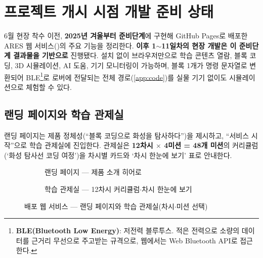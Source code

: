 \chapter{프로젝트 개시 시점 개발 준비 상태}
6월 현장 착수 이전, \textbf{2025년 겨울부터 준비단계}에 구현해 GitHub Pages로 배포한
ARES 웹 서비스(\href{https://dknife.github.io/ARES2}{})의
주요 기능을 정리한다. \textbf{이후 1$\sim$11일차의 현장 개발은 이 준비단계 결과물을
기반으로} 진행됐다. 설치 없이 브라우저만으로 학습 콘텐츠 열람, 블록 코딩, 3D
시뮬레이션, AI 도움, 기기 모니터링이 가능하며, 블록 1개가 명령 문자열로 변환되어
BLE\footnote{\textbf{BLE(Bluetooth Low Energy)}: 저전력 블루투스. 적은 전력으로 소량의
데이터를 근거리 무선으로 주고받는 규격으로, 웹에서는 Web Bluetooth API로 접근한다.}로
로버에 전달되는 전체 경로(\ref{app:code})를 실물 기기 없이도 시뮬레이션으로
체험할 수 있다.

\section{랜딩 페이지와 학습 관제실}
랜딩 페이지는 제품 정체성(``블록 코딩으로 화성을 탐사하다'')을 제시하고, ``서비스
시작''으로 학습 관제실에 진입한다. 관제실은 \textbf{12차시 $\times$ 4미션 = 48개 미션}의
커리큘럼(‘화성 탐사선 코딩 여정’)을 차시별 카드와 ‘차시 한눈에 보기’ 표로 안내한다.

\begin{figure}[htbp]\centering
  \begin{subfigure}{0.49\linewidth}\centering
    \caption{랜딩 페이지 — 제품 소개 히어로}
  \end{subfigure}\hfill
  \begin{subfigure}{0.49\linewidth}\centering
    \caption{학습 관제실 — 12차시 커리큘럼$\cdot$차시 한눈에 보기}
  \end{subfigure}
  \caption{배포 웹 서비스 — 랜딩 페이지와 학습 관제실(차시$\cdot$미션 선택)}
\end{figure}

